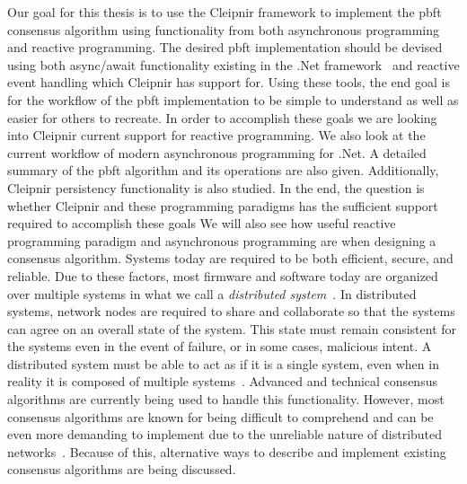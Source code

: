 Our goal for this thesis is to use the Cleipnir framework to implement the \acl{pbft} consensus algorithm using functionality from both asynchronous programming and reactive programming. The desired \ac{pbft} implementation should be devised using both async/await functionality existing in the .Net framework~\cite{DOC:AsyncAwait} and reactive event handling which Cleipnir has support for. Using these tools, the end goal is for the workflow of the \ac{pbft} implementation to be simple to understand as well as easier for others to recreate. In order to accomplish these goals we are looking into Cleipnir current support for reactive programming. We also look at the current workflow of modern asynchronous programming for .Net. A detailed summary of the \ac{pbft} algorithm and its operations are also given. Additionally, Cleipnir persistency functionality is also studied.
In the end, the question is whether Cleipnir and these programming paradigms has the sufficient support required to accomplish these goals We will also see how useful reactive programming paradigm and asynchronous programming are when designing a consensus algorithm.
\fi
Systems today are required to be both efficient, secure, and reliable. Due to these factors, most firmware and software today are organized over multiple systems in what we call a \textit{distributed system}~\cites{WEB:DistSys}[p.~16]{BOOK:MVstandver3}. In distributed systems, network nodes are required to share and collaborate so that the systems can agree on an overall state of the system. This state must remain consistent for the systems even in the event of failure, or in some cases, malicious intent. A distributed system must be able to act as if it is a single system, even when in reality it is composed of multiple systems~\cite[p.~18]{BOOK:MVstandver3}. Advanced and technical consensus algorithms are currently being used to handle this functionality.
However, most consensus algorithms are known for being difficult to comprehend and can be even more demanding to implement due to the unreliable nature of distributed networks~\cites[p.~459]{BOOK:MVstandver3}[p.~13]{PAPER:EivindPaper}. Because of this, alternative ways to describe and implement existing consensus algorithms are being discussed.

